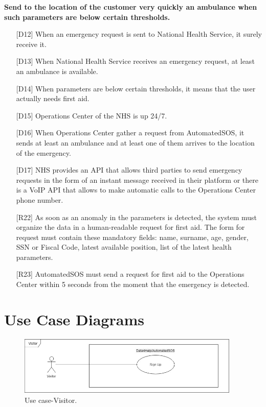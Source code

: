 \begin{enumerate} [resume, label={\bf[G\arabic*]}]
    \item \textbf{Send to the location of the customer very quickly an ambulance when such parameters are below certain thresholds.}
        \begin{itemize}
            \item [{[D12]}] When an emergency request is sent to National Health Service, it surely receive it.
            \item [{[D13]}] When National Health Service receives an emergency request, at least an ambulance is available.
            \item [{[D14]}] When  parameters  are  below  certain  thresholds,  it  means  that  the  user actually needs first aid.
            \item [{[D15]}] Operations Center of the NHS is up 24/7.
            \item [{[D16]}] When Operations Center gather a request from AutomatedSOS, it sends at least an ambulance and at least one of them arrives to the location of the emergency.
            \item [{[D17]}] NHS provides an API that allows third parties to send emergency requests in the form of an instant message received in their platform or there is a VoIP API that allows to make automatic calls to the Operations Center phone number.
            \item [{[R22]}] As soon as an anomaly in the parameters is detected, the system must organize the data in a human-readable request for first aid. The form for request must contain these mandatory fields: name, surname, age, gender, SSN or Fiscal Code, latest available position, list of the latest health parameters.
            \item [{[R23]}] AutomatedSOS must send a request for first aid to the Operations Center within 5 seconds from the moment that the emergency is detected.
        \end{itemize}
\end{enumerate}


\section{Use Case Diagrams}
\begin{figure}[ht]
    \setcounter{figure}{0}
    \renewcommand{\thefigure}{\alph{figure}}
    \centering
    \captionsetup{labelformat=parens, labelsep=space, name=}
    \includegraphics[width = 300pt]{images/Use-case/UCVisitor.jpg}
    \caption{Use case-Visitor.}
\end{figure}


